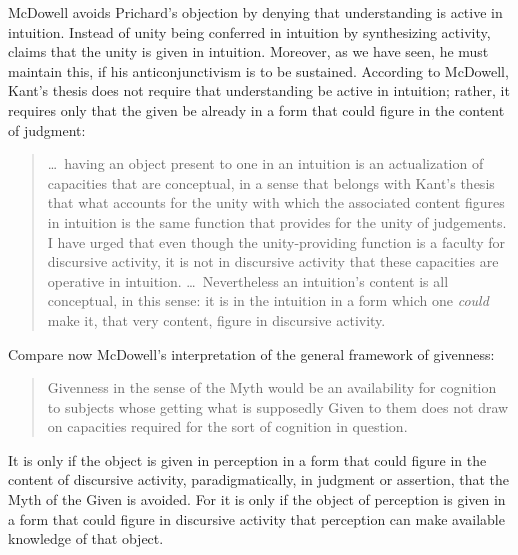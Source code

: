 \documentclass[12pt]{article}
\begin{document}
McDowell avoids Prichard's objection by denying that understanding is active in intuition. Instead of unity being conferred in intuition by synthesizing activity, \citet[7]{McDowell:2008fk} claims that the unity is given in intuition. Moreover, as we have seen, he must maintain this, if his anticonjunctivism is to be sustained. According to McDowell, Kant's \citeyearpar[A79/B104--5]{Kant:1781fk} thesis does not require that understanding be active in intuition; rather, it requires only that the given be already in a form that could figure in the content of judgment:
\begin{quote}
	\ldots\ having an object present to one in an intuition is an actualization of capacities that are conceptual, in a sense that belongs with Kant's thesis that what accounts for the unity with which the associated content figures in intuition is the same function that provides for the unity of judgements. I have urged that even though the unity-providing function is a faculty for discursive activity, it is not in discursive activity that these capacities are operative in intuition. \ldots\ Nevertheless an intuition's content is all conceptual, in this sense: it is in the intuition in a form which one \emph{could} make it, that very content, figure in discursive activity. \citep[265]{McDowell:2008fk}
\end{quote}
Compare now McDowell's interpretation of the general framework of givenness:
\begin{quote}
	Givenness in the sense of the Myth would be an availability for cognition to subjects whose getting what is supposedly Given to them does not draw on capacities required for the sort of cognition in question. \citep[256]{McDowell:2008fk}
\end{quote}
It is only if the object is given in perception in a form that could figure in the content of discursive activity, paradigmatically, in judgment or assertion, that the Myth of the Given is avoided. For it is only if the object of perception is given in a form that could figure in discursive activity that perception can make available knowledge of that object. 
\end{document}
